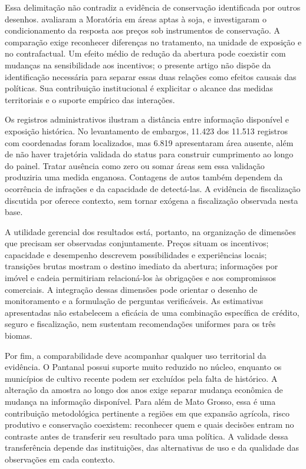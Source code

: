Essa delimitação não contradiz a evidência de conservação identificada por outros desenhos.  avaliaram a Moratória em áreas aptas à soja, e  investigaram o condicionamento da resposta aos preços sob instrumentos de conservação. A comparação exige reconhecer diferenças no tratamento, na unidade de exposição e no contrafactual. Um efeito médio de redução da abertura pode coexistir com mudanças na sensibilidade aos incentivos; o presente artigo não dispõe da identificação necessária para separar essas duas relações como efeitos causais das políticas. Sua contribuição institucional é explicitar o alcance das medidas territoriais e o suporte empírico das interações.

Os registros administrativos ilustram a distância entre informação disponível e exposição histórica. No levantamento de embargos, 11.423 dos 11.513 registros com coordenadas foram localizados, mas 6.819 apresentaram área ausente, além de não haver trajetória validada do status para construir cumprimento ao longo do painel. Tratar ausência como zero ou somar áreas sem essa validação produziria uma medida enganosa. Contagens de autos também dependem da ocorrência de infrações e da capacidade de detectá-las. A evidência de fiscalização discutida por  oferece contexto, sem tornar exógena a fiscalização observada nesta base.

A utilidade gerencial dos resultados está, portanto, na organização de dimensões que precisam ser observadas conjuntamente. Preços situam os incentivos; capacidade e desempenho descrevem possibilidades e experiências locais; transições brutas mostram o destino imediato da abertura; informações por imóvel e cadeia permitiriam relacioná-los às obrigações e aos compromissos comerciais. A integração dessas dimensões pode orientar o desenho de monitoramento e a formulação de perguntas verificáveis. As estimativas apresentadas não estabelecem a eficácia de uma combinação específica de crédito, seguro e fiscalização, nem sustentam recomendações uniformes para os três biomas.

Por fim, a comparabilidade deve acompanhar qualquer uso territorial da evidência. O Pantanal possui suporte muito reduzido no núcleo, enquanto os municípios de cultivo recente podem ser excluídos pela falta de histórico. A alteração da amostra ao longo dos anos exige separar mudança econômica de mudança na informação disponível. Para além de Mato Grosso, essa é uma contribuição metodológica pertinente a regiões em que expansão agrícola, risco produtivo e conservação coexistem: reconhecer quem e quais decisões entram no contraste antes de transferir seu resultado para uma política. A validade dessa transferência depende das instituições, das alternativas de uso e da qualidade das observações em cada contexto.

